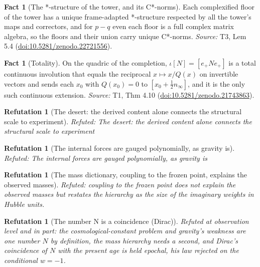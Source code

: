 \documentclass[11pt]{article}
\newtheorem{refutation}[theorem]{Refutation}
\theoremstyle{definition}
\newtheorem{fact}[theorem]{Fact}
\theoremstyle{plain}
\providecommand{\nInf}{}\renewcommand{\nInf}{n_\infty}
\begin{document}
\begin{fact}[The *-structure of the tower, and its C*-norms]\label{c:tower.structure-tower-c-norms}
Each complexified floor of the tower has a unique frame-adapted *-structure respected by all the tower's maps and correctors, and for $p - q$ even each floor is a full complex matrix algebra, so the floors and their union carry unique C*-norms.
\emph{Source:} T3, Lem 5.4 (\href{https://doi.org/10.5281/zenodo.22721556}{doi:10.5281/zenodo.22721556}).
\end{fact}

\begin{fact}[Totality]\label{c:transport.totality}
On the quadric of the completion, $\iota[N] = [e_+ N e_+]$ is a total continuous involution that equals the reciprocal $x \mapsto x/Q(x)$ on invertible vectors and sends each $x_0$ with $Q(x_0) = 0$ to $[x_0 + \frac12 \nInf]$, and it is the only such continuous extension.
\emph{Source:} T1, Thm 4.10 (\href{https://doi.org/10.5281/zenodo.21743863}{doi:10.5281/zenodo.21743863}).
\end{fact}

\begin{refutation}[The desert: the derived content alone connects the structural scale to experiment]\label{c:refuted.the-desert-the-derived-content-alone-connects-th}
Refuted: The desert: the derived content alone connects the structural scale to experiment
\end{refutation}

\begin{refutation}[The internal forces are gauged polynomially, as gravity is]\label{c:refuted.the-internal-forces-are-gauged-polynomially-as-g}
Refuted: The internal forces are gauged polynomially, as gravity is
\end{refutation}

\begin{refutation}[The mass dictionary, coupling to the frozen point, explains the observed masses]\label{c:refuted.the-mass-dictionary-coupling-to-the-frozen-point}
Refuted: coupling to the frozen point does not explain the observed masses but restates the hierarchy as the size of the imaginary weights in Hubble units.
\end{refutation}

\begin{refutation}[The number N is a coincidence (Dirac)]\label{c:refuted.the-number-n-is-a-coincidence-dirac}
Refuted at observation level and in part: the cosmological-constant problem and gravity's weakness are one number $N$ by definition, the mass hierarchy needs a second, and Dirac's coincidence of $N$ with the present age is held epochal, his law rejected on the conditional $w = -1$.
\end{refutation}
\end{document}
